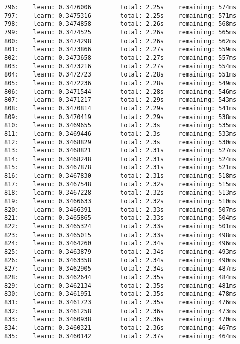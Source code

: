 \documentclass[11pt]{article}
\begin{document}
\begin{Verbatim}[commandchars=\\\{\}]
796:    learn: 0.3476006        total: 2.25s    remaining: 574ms
797:    learn: 0.3475316        total: 2.25s    remaining: 571ms
798:    learn: 0.3474858        total: 2.26s    remaining: 568ms
799:    learn: 0.3474525        total: 2.26s    remaining: 565ms
800:    learn: 0.3474298        total: 2.26s    remaining: 562ms
801:    learn: 0.3473866        total: 2.27s    remaining: 559ms
802:    learn: 0.3473658        total: 2.27s    remaining: 557ms
803:    learn: 0.3473216        total: 2.27s    remaining: 554ms
804:    learn: 0.3472723        total: 2.28s    remaining: 551ms
805:    learn: 0.3472236        total: 2.28s    remaining: 549ms
806:    learn: 0.3471544        total: 2.28s    remaining: 546ms
807:    learn: 0.3471217        total: 2.29s    remaining: 543ms
808:    learn: 0.3470814        total: 2.29s    remaining: 541ms
809:    learn: 0.3470419        total: 2.29s    remaining: 538ms
810:    learn: 0.3469655        total: 2.3s     remaining: 535ms
811:    learn: 0.3469446        total: 2.3s     remaining: 533ms
812:    learn: 0.3468829        total: 2.3s     remaining: 530ms
813:    learn: 0.3468821        total: 2.31s    remaining: 527ms
814:    learn: 0.3468248        total: 2.31s    remaining: 524ms
815:    learn: 0.3467878        total: 2.31s    remaining: 521ms
816:    learn: 0.3467830        total: 2.31s    remaining: 518ms
817:    learn: 0.3467548        total: 2.32s    remaining: 515ms
818:    learn: 0.3467228        total: 2.32s    remaining: 513ms
819:    learn: 0.3466633        total: 2.32s    remaining: 510ms
820:    learn: 0.3466391        total: 2.33s    remaining: 507ms
821:    learn: 0.3465865        total: 2.33s    remaining: 504ms
822:    learn: 0.3465324        total: 2.33s    remaining: 501ms
823:    learn: 0.3465015        total: 2.33s    remaining: 498ms
824:    learn: 0.3464260        total: 2.34s    remaining: 496ms
825:    learn: 0.3463879        total: 2.34s    remaining: 493ms
826:    learn: 0.3463358        total: 2.34s    remaining: 490ms
827:    learn: 0.3462905        total: 2.34s    remaining: 487ms
828:    learn: 0.3462644        total: 2.35s    remaining: 484ms
829:    learn: 0.3462134        total: 2.35s    remaining: 481ms
830:    learn: 0.3461951        total: 2.35s    remaining: 478ms
831:    learn: 0.3461723        total: 2.35s    remaining: 476ms
832:    learn: 0.3461258        total: 2.36s    remaining: 473ms
833:    learn: 0.3460938        total: 2.36s    remaining: 470ms
834:    learn: 0.3460321        total: 2.36s    remaining: 467ms
835:    learn: 0.3460142        total: 2.37s    remaining: 464ms

\end{Verbatim}
\end{document}
